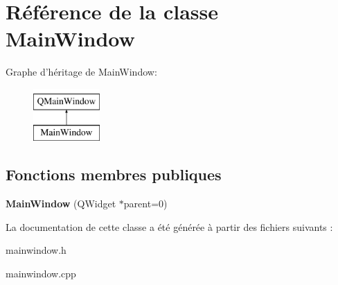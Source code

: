 \hypertarget{class_main_window}{\section{Référence de la classe Main\+Window}
\label{class_main_window}
}
Graphe d'héritage de Main\+Window\+:\begin{figure}[H]
\begin{center}
\leavevmode
\includegraphics[height=2.000000cm]{class_main_window}
\end{center}
\end{figure}
\subsection*{Fonctions membres publiques}
\begin{DoxyCompactItemize}
\item 
\hypertarget{class_main_window_a8b244be8b7b7db1b08de2a2acb9409db}{{\bfseries Main\+Window} (Q\+Widget $\ast$parent=0)}\label{class_main_window_a8b244be8b7b7db1b08de2a2acb9409db}

\end{DoxyCompactItemize}


La documentation de cette classe a été générée à partir des fichiers suivants \+:\begin{DoxyCompactItemize}
\item 
mainwindow.\+h\item 
mainwindow.\+cpp\end{DoxyCompactItemize}
